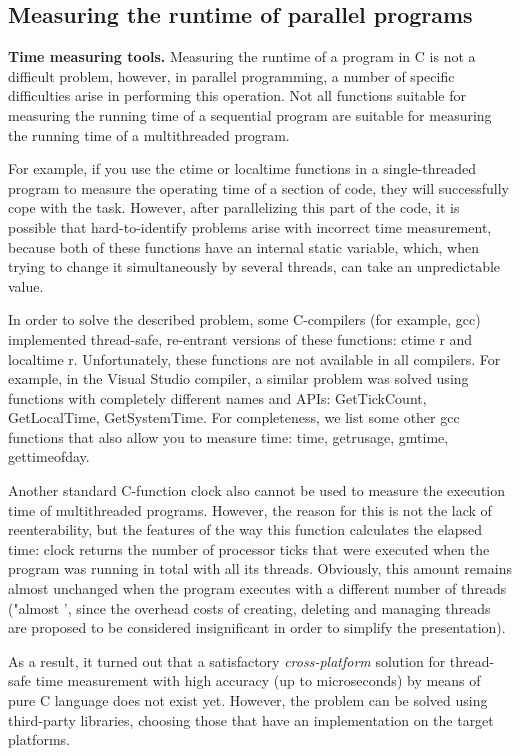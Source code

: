{ %
	\subsection{Measuring the runtime of parallel programs}
	\par\textbf{Time measuring tools.} Measuring the runtime of a program in C is not a difficult problem, however, in parallel programming, a number of specific difficulties arise in performing this operation. Not all functions suitable for measuring the running time of a sequential program are suitable for measuring the running time of a multithreaded program.
	\par For example, if you use the ctime or localtime functions in a single-threaded program to measure the operating time of a section of code, they will successfully cope with the task. However, after parallelizing this part of the code, it is possible that hard-to-identify problems arise with incorrect time measurement, because both of these functions have an internal static variable, which, when trying to change it simultaneously by several threads, can take an unpredictable value.
	\par In order to solve the described problem, some C-compilers (for example, gcc) implemented thread-safe, re-entrant versions of these functions: ctime \textunderscore r and localtime \textunderscore r. Unfortunately, these functions are not available in all compilers. For example, in the Visual Studio compiler, a similar problem was solved using functions with completely different names and APIs: GetTickCount, GetLocalTime, GetSystemTime. For completeness, we list some other gcc functions that also allow you to measure time: time, getrusage, gmtime, gettimeofday.
	\par Another standard C-function clock also cannot be used to measure the execution time of multithreaded programs. However, the reason for this is not the lack of reenterability, but the features of the way this function calculates the elapsed time: clock returns the number of processor ticks that were executed when the program was running in total with all its threads. Obviously, this amount remains almost unchanged when the program executes with a different number of threads ("almost ', since the overhead costs of creating, deleting and managing threads are proposed to be considered insignificant in order to simplify the presentation).
	\par As a result, it turned out that a satisfactory \textit{cross-platform} solution for thread-safe time measurement with high accuracy (up to microseconds) by means of pure C language does not exist yet. However, the problem can be solved using third-party libraries, choosing those that have an implementation on the target platforms.
}

